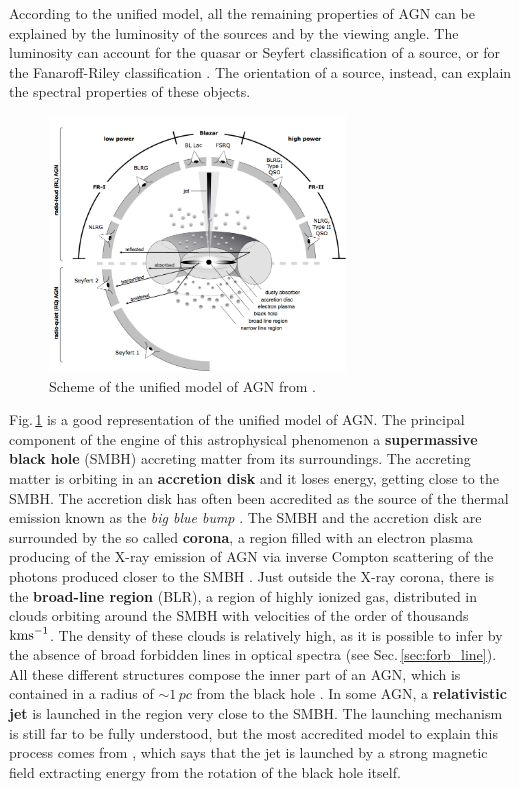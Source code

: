 \documentclass[../thesis.tex]{subfiles}
\begin{document}
According to the unified model, all the remaining properties of AGN can be explained by the luminosity of the sources and by the viewing angle.
The luminosity can account for the quasar or Seyfert classification of a source, or for the Fanaroff-Riley classification \citep{Fanaroff74}.
The orientation of a source, instead, can explain the spectral properties of these objects.

\begin{figure}
\centering
\includegraphics[width=0.7\textwidth]{images/AGNmodel.png} 
\caption[]{Scheme of the unified model of AGN from \citet{Beckmann12}. }
\label{fig:unified_model}
\end{figure}

Fig.\,\ref{fig:unified_model} is a good representation of the unified model of AGN.
The principal component of the engine of this astrophysical phenomenon a \textbf{supermassive black hole} (SMBH) accreting matter from its surroundings.
The accreting matter is orbiting in an \textbf{accretion disk} and it loses energy, getting close to the SMBH.
The accretion disk has often been accredited as the source of the thermal emission known as the \emph{big blue bump} \citep[e.g.][]{Shang05}.
The SMBH and the accretion disk are surrounded by the so called \textbf{corona}, a region filled with an electron plasma producing of the X-ray emission of AGN via inverse Compton scattering of the photons produced closer to the SMBH \citep{Haardt91}.
Just outside the X-ray corona, there is the \textbf{broad-line region} (BLR), a region of highly ionized gas, distributed in clouds orbiting around the SMBH with velocities of the order of thousands $\si{\kms}$. 
The density of these clouds is relatively high, as it is possible to infer by the absence of broad forbidden lines in optical spectra (see Sec.\,\ref{sec:forb_line}).
All these different structures compose the inner part of an AGN, which is contained in a radius of $\sim 1\,\si{pc}$ from the black hole \citep{Beckmann12}.
In some AGN, a \textbf{relativistic jet} is launched in the region very close to the SMBH. 
The launching mechanism is still far to be fully understood, but the most accredited model to explain this process comes from \citet{Blandford77}, which says that the jet is launched by a strong magnetic field extracting energy from the rotation of the black hole itself.
\end{document}
